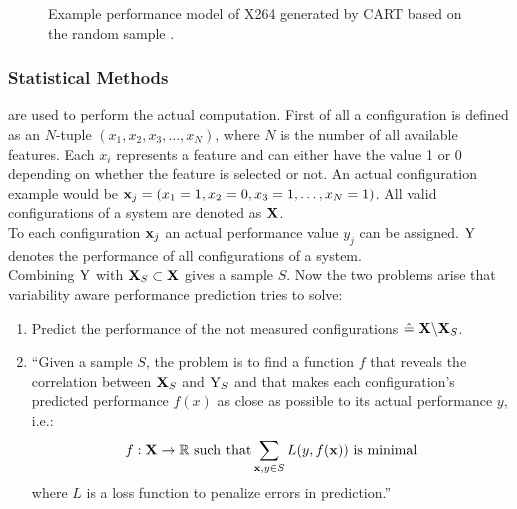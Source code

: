 \begin{figure}[!]
	\vspace{-1\baselineskip}
	\setlength{}
	
	\caption{Example performance model of X264 generated by CART based on the random sample \cite{VariabilityAwarePerformancePredictionJianmeiSigmundApel}.}	
	\label{fig:VAPPExampleTree}	
\end{figure}
\FloatBarrier %
\subsubsection{Statistical Methods}\label{sec:VAPPMethods}  are used to perform the actual computation. First of all a configuration is defined as an $N$-tuple $(x_1,x_2,x_3,...,x_N)$, where $N$ is the number of all available features. Each $x_i$ represents a feature and can either have the value 1 or 0 depending on whether the feature is selected or not. An actual configuration example would be $\mathrm{\mathbf{x}}_j = (x_1=1,x_2=0,x_3=1,\dots,x_N = 1)$. All valid configurations of a system are denoted as $\mathbf{X}$.\\
To each configuration $\mathrm{\mathbf{x}}_j$ an actual performance value $y_j$ can be assigned. $\mathrm{Y}$ denotes the performance of all configurations of a system.\\
Combining $\mathrm{Y}$ with $\mathbf{X}_S\subset\mathbf{X}$ gives a sample $S$. Now the two problems arise that variability aware performance prediction tries to solve:
\begin{enumerate}
	\item Predict the performance of the not measured configurations $\hat{=}\;\mathbf{X}\backslash\mathbf{X}_S$.
	\item ``Given a sample $S$, the problem is to find a function $f$ that reveals the correlation between $\mathbf{X}_S$ and $\mathrm{Y}_S$ and that makes each configuration’s predicted performance $f(x)$ as close as possible to its actual performance $y$, i.e.:
	\begin{equation}
	f : \mathbf{X} \rightarrow  \mathbb{R} \text{ such that} \sum_{\mathrm{\mathbf{x}},y \in S} L(y,f(\mathrm{\mathbf{x}})) \text{ is minimal}
	\end{equation} 	where $L$ is a loss function to penalize errors in prediction.''\cite{VariabilityAwarePerformancePredictionJianmeiSigmundApel}
\end{enumerate}
